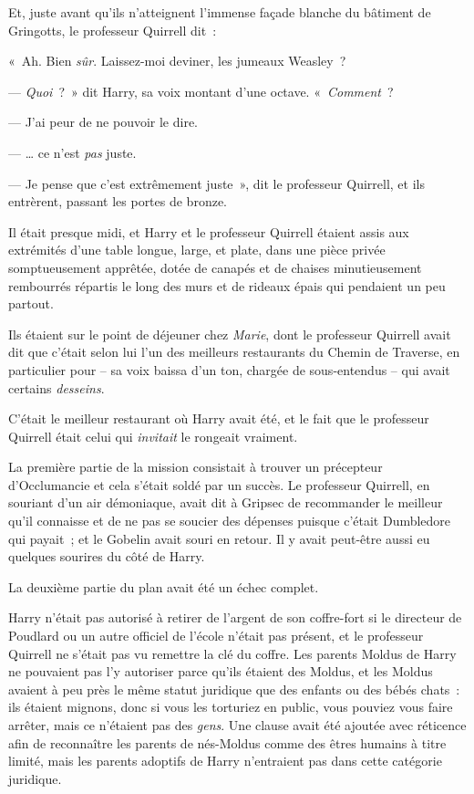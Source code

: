 Et, juste avant qu'ils n'atteignent l'immense façade blanche du bâtiment de Gringotts, le professeur Quirrell dit~:

«~Ah. Bien \emph{sûr}.
Laissez-moi deviner, les jumeaux Weasley~?

--- \emph{Quoi}~?~»
dit Harry, sa voix montant d'une octave.
«~\emph{Comment}~?

--- J'ai peur de ne pouvoir le dire.

--- … ce n'est \emph{pas} juste.

--- Je pense que c'est extrêmement juste~», dit le professeur Quirrell, et ils entrèrent, passant les portes de bronze.

\later

Il était presque midi, et Harry et le professeur Quirrell étaient assis aux extrémités d'une table longue, large, et plate, dans une pièce privée somptueusement apprêtée, dotée de canapés et de chaises minutieusement rembourrés répartis le long des murs et de rideaux épais qui pendaient un peu partout.

Ils étaient sur le point de déjeuner chez \emph{Marie}, dont le professeur Quirrell avait dit que c'était selon lui l'un des meilleurs restaurants du Chemin de Traverse, en particulier pour -- sa voix baissa d'un ton, chargée de sous-entendus -- qui avait certains \emph{desseins}.

C'était le meilleur restaurant où Harry avait été, et le fait que le professeur Quirrell était celui qui \emph{invitait} le rongeait vraiment.

La première partie de la mission consistait à trouver un précepteur d'Occlumancie et cela s'était soldé par un succès.
Le professeur Quirrell, en souriant d'un air démoniaque, avait dit à Gripsec de recommander le meilleur qu'il connaisse et de ne pas se soucier des dépenses puisque c'était Dumbledore qui payait~; et le Gobelin avait souri en retour.
Il y avait peut-être aussi eu quelques sourires du côté de Harry.

La deuxième partie du plan avait été un échec complet.

Harry n'était pas autorisé à retirer de l'argent de son coffre-fort si le directeur de Poudlard ou un autre officiel de l'école n'était pas présent, et le professeur Quirrell ne s'était pas vu remettre la clé du coffre.
Les parents Moldus de Harry ne pouvaient pas l'y autoriser parce qu'ils étaient des Moldus, et les Moldus avaient à peu près le même statut juridique que des enfants ou des bébés chats~: ils étaient mignons, donc si vous les torturiez en public, vous pouviez vous faire arrêter, mais ce n'étaient pas des \emph{gens}.
Une clause avait été ajoutée avec réticence afin de reconnaître les parents de nés-Moldus comme des êtres humains à titre limité, mais les parents adoptifs de Harry n'entraient pas dans cette catégorie juridique.

